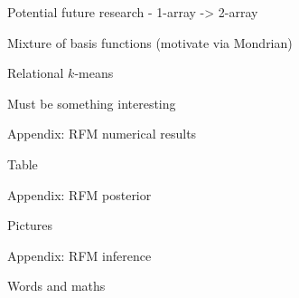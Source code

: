 \begin{frame}{Potential future research - 1-array -> 2-array}
  \begin{block}{}
    \eg Mixture of basis functions (motivate via Mondrian)
    
    Relational $k$-means
    
    Must be something interesting
  \end{block}
\end{frame}

\begin{frame}{Appendix: RFM numerical results}
  \begin{block}{}
    Table
  \end{block}
\end{frame}

\begin{frame}{Appendix: RFM posterior}
  \begin{block}{}
    Pictures
  \end{block}
\end{frame}

\begin{frame}{Appendix: RFM inference}
  \begin{block}{}
    Words and maths
  \end{block}
\end{frame}




